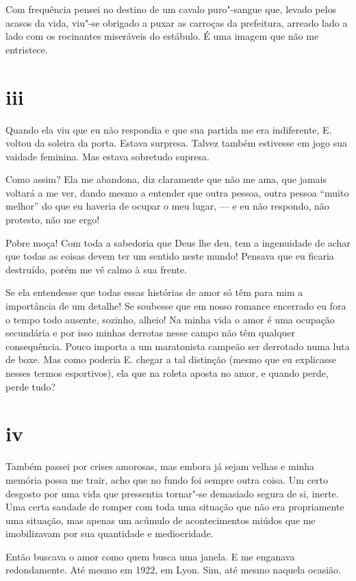 Com frequência pensei no destino de um cavalo puro"-sangue que,
levado pelos acasos da vida, viu"-se obrigado a puxar as carroças da
prefeitura, arreado lado a lado com os rocinantes miseráveis do
estábulo. É uma imagem que não me entristece.

\section{iii}



Quando ela viu que eu não respondia e que sua partida me era
indiferente, E. voltou da soleira da porta. Estava surpresa. Talvez
também estivesse em jogo sua vaidade feminina. Mas
estava sobretudo supresa.

Como assim? Ela me abandona, diz claramente que não me ama, que jamais
voltará a me ver, dando mesmo a entender que outra pessoa, outra pessoa
``muito melhor'' do que eu haveria de ocupar o meu lugar, --- e eu não
respondo, não protesto, não me ergo!

Pobre moça! Com toda a sabedoria que Deus lhe deu, tem a
ingenuidade de achar que todas as coisas devem ter um sentido
neste mundo! Pensava que eu ficaria destruído, porém me vê calmo à sua
frente.

Se ela entendesse que todas essas histórias de amor só têm para mim a
importância de um detalhe! Se soubesse que em nosso romance
encerrado eu fora o tempo todo ausente, sozinho, alheio! Na minha vida
o amor é uma ocupação secundária e por isso minhas derrotas nesse
campo não têm qualquer consequência. Pouco importa a um maratonista
campeão ser derrotado numa luta de boxe. Mas como poderia E. chegar a
tal distinção (mesmo que eu explicasse nesses termos esportivos), ela
que na roleta aposta no amor, e quando perde, perde tudo?

\section{iv}

Também passei por crises amorosas, mas embora já sejam velhas e minha
memória possa me trair, acho que no fundo foi sempre outra coisa. Um
certo desgosto por uma vida que pressentia tornar"-se demasiado segura
de si, inerte. Uma certa saudade de romper com toda uma
situação que não era propriamente uma situação, mas apenas um acúmulo
de acontecimentos miúdos que me imobilizavam por sua quantidade e
mediocridade.

Então buscava o amor como quem busca uma janela. E me enganava
redondamente. Até mesmo em 1922, em Lyon. Sim, até mesmo naquela
ocasião.


